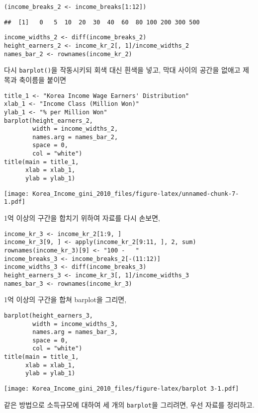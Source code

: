 \documentclass[
]{article}
\begin{document}
\begin{verbatim}
(income_breaks_2 <- income_breaks[1:12])
\end{verbatim}

\begin{verbatim}
##  [1]   0   5  10  20  30  40  60  80 100 200 300 500
\end{verbatim}

\begin{verbatim}
income_widths_2 <- diff(income_breaks_2)
height_earners_2 <- income_kr_2[, 1]/income_widths_2
names_bar_2 <- rownames(income_kr_2)
\end{verbatim}

다시 \texttt{barplot()}을 작동시키되 회색 대신 흰색을 넣고, 막대 사이의
공간을 없애고 제목과 축이름을 붙이면

\begin{verbatim}
title_1 <- "Korea Income Wage Earners' Distribution"
xlab_1 <- "Income Class (Million Won)"
ylab_1 <- "% per Million Won"
barplot(height_earners_2, 
        width = income_widths_2, 
        names.arg = names_bar_2, 
        space = 0, 
        col = "white")
title(main = title_1, 
      xlab = xlab_1, 
      ylab = ylab_1)
\end{verbatim}

\texttt{[image: Korea\_Income\_gini\_2010\_files/figure-latex/unnamed-chunk-7-1.pdf]}

1억 이상의 구간을 합치기 위하여 자료를 다시 손보면,

\begin{verbatim}
income_kr_3 <- income_kr_2[1:9, ]
income_kr_3[9, ] <- apply(income_kr_2[9:11, ], 2, sum)
rownames(income_kr_3)[9] <- "100 -   "
income_breaks_3 <- income_breaks_2[-(11:12)]
income_widths_3 <- diff(income_breaks_3)
height_earners_3 <- income_kr_3[, 1]/income_widths_3
names_bar_3 <- rownames(income_kr_3)
\end{verbatim}

1억 이상의 구간을 합쳐 barplot을 그리면,

\begin{verbatim}
barplot(height_earners_3, 
        width = income_widths_3, 
        names.arg = names_bar_3, 
        space = 0, 
        col = "white")
title(main = title_1, 
      xlab = xlab_1, 
      ylab = ylab_1)
\end{verbatim}

\texttt{[image: Korea\_Income\_gini\_2010\_files/figure-latex/barplot 3-1.pdf]}

같은 방법으로 소득규모에 대하여 세 개의 \texttt{barplot}을 그리려면,
우선 자료를 정리하고.
\end{document}
